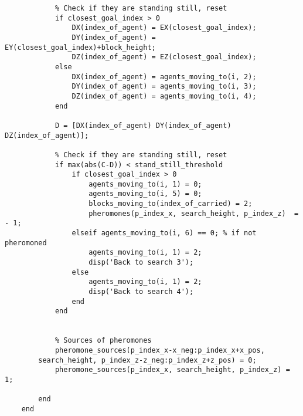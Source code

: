 \begin{lstlisting}
            % Check if they are standing still, reset
            if closest_goal_index > 0
                DX(index_of_agent) = EX(closest_goal_index);
                DY(index_of_agent) = EY(closest_goal_index)+block_height;
                DZ(index_of_agent) = EZ(closest_goal_index);
            else
                DX(index_of_agent) = agents_moving_to(i, 2);
                DY(index_of_agent) = agents_moving_to(i, 3);
                DZ(index_of_agent) = agents_moving_to(i, 4);
            end
          
            D = [DX(index_of_agent) DY(index_of_agent) DZ(index_of_agent)];
            
            % Check if they are standing still, reset
            if max(abs(C-D)) < stand_still_threshold                
                if closest_goal_index > 0
                    agents_moving_to(i, 1) = 0;
                    agents_moving_to(i, 5) = 0;
                    blocks_moving_to(index_of_carried) = 2;
                    pheromones(p_index_x, search_height, p_index_z)  = - 1;  
                elseif agents_moving_to(i, 6) == 0; % if not pheromoned
                    agents_moving_to(i, 1) = 2;
                    disp('Back to search 3');
                else
                    agents_moving_to(i, 1) = 2;
                    disp('Back to search 4');
                end
            end
            
            
            % Sources of pheromones
            pheromone_sources(p_index_x-x_neg:p_index_x+x_pos, 
		search_height, p_index_z-z_neg:p_index_z+z_pos) = 0;
            pheromone_sources(p_index_x, search_height, p_index_z) = 1;
            
        end
    end

\end{lstlisting}